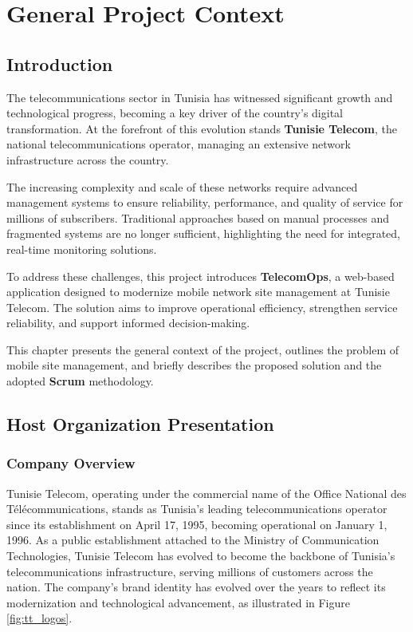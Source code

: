\chapter{General Project Context}

\section{Introduction}

The telecommunications sector in Tunisia has witnessed significant growth and technological progress, becoming a key driver of the country's digital transformation. At the forefront of this evolution stands \textbf{Tunisie Telecom}, the national telecommunications operator, managing an extensive network infrastructure across the country.

The increasing complexity and scale of these networks require advanced management systems to ensure reliability, performance, and quality of service for millions of subscribers. Traditional approaches based on manual processes and fragmented systems are no longer sufficient, highlighting the need for integrated, real-time monitoring solutions.

To address these challenges, this project introduces \textbf{TelecomOps}, a web-based application designed to modernize mobile network site management at Tunisie Telecom. The solution aims to improve operational efficiency, strengthen service reliability, and support informed decision-making.

This chapter presents the general context of the project, outlines the problem of mobile site management, and briefly describes the proposed solution and the adopted \textbf{Scrum} methodology.

\section{Host Organization Presentation}

\subsection{Company Overview}
Tunisie Telecom, operating under the commercial name of the Office National des Télécommunications, stands as Tunisia's leading telecommunications operator since its establishment on April 17, 1995, becoming operational on January 1, 1996. As a public establishment attached to the Ministry of Communication Technologies, Tunisie Telecom has evolved to become the backbone of Tunisia's telecommunications infrastructure, serving millions of customers across the nation. The company's brand identity has evolved over the years to reflect its modernization and technological advancement, as illustrated in Figure \ref{fig:tt_logos}.

